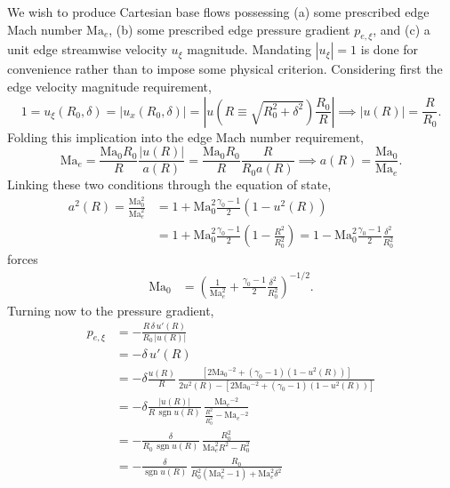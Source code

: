\documentclass[letterpaper,11pt,nointlimits,reqno]{amsart}
\newcommand{\Mach}[1][]{\mbox{Ma}_{#1}}
\begin{document}
We wish to produce Cartesian base flows possessing
(a) some prescribed edge Mach number $\Mach[e]{}$,
(b) some prescribed edge pressure gradient $p_{e,\xi}$, and
(c) a unit edge streamwise velocity $u_\xi$ magnitude.
%
Mandating $\left|u_\xi\right|=1$ is done for convenience rather than to impose
some physical criterion.
%
Considering first the edge velocity magnitude requirement,
\begin{equation}
    1
    = u_\xi\!\left(R_0, \delta\right)
    = \left| u_x\!\left(R_0,\delta\right) \right|
    = \left| u  \!\left(R\equiv\sqrt{R_0^2+\delta^2}\right) \frac{R_0}{R} \right|
\implies
    \left|u\!\left(R\right)\right| = \frac{R}{R_0}
.
\end{equation}
%
Folding this implication into the edge Mach number requirement,
\begin{equation}
    \Mach[e]{}
    =
    \frac{\Mach[0]{} R_0}{R}
    \frac{\left|u\!\left(R\right)\right|}
         {      a\!\left(R\right)       }
    =
    \frac{\Mach[0]{} R_0}{R}
    \frac{R}{R_0 a\!\left(R\right)}
\implies
    a\!\left( R \right) = \frac{\Mach[0]}{\Mach[e]}
.
\end{equation}
%
Linking these two conditions through the equation of state,
\begin{align}
    a^2\!\left(R\right)
    = \frac{\Mach[0]^2}{\Mach[e]^2}
   &= 1 + \Mach[0]^2\frac{\gamma_0-1}{2}\left(1-u^2\!\left(R\right)\right)
\\ &= 1 + \Mach[0]^2\frac{\gamma_0-1}{2}\left(1-\frac{R^2}{R_0^2}\right)
    = 1 - \Mach[0]^2\frac{\gamma_0-1}{2}\frac{\delta^2}{R_0^2}
\end{align}
forces
\begin{align}
    \Mach[0] &= \left(
        \frac{1}{\Mach[e]^2} + \frac{\gamma_0-1}{2}\frac{\delta^2}{R_0^2}
    \right)^{-1/2}
.
\end{align}
%
Turning now to the pressure gradient,
\begin{align}
  p_{e,\xi}
  &=
  - \frac{R \, \delta \, u'\!\left(R\right)}{R_0 \, \left|u\!\left(R\right)\right|}
\\&=
  - \delta \, u'\!\left(R\right)
\\&=
  - \delta
  \frac{u\!\left(R\right)}{R}
       \,
       \frac{
         \left[
             2 \Mach[0]{}^{-2} + \left(\gamma_0-1\right) \left(1 - u^2\!\left(R\right)\right)
         \right]
       }{
           2 u^2\!\left(R\right)
         - \left[
             2 \Mach[0]{}^{-2} + \left(\gamma_0-1\right) \left(1 - u^2\!\left(R\right)\right)
           \right]
       }
\\&=
  - \delta
  \frac{\left|u\!\left(R\right)\right|}{R \, \operatorname{sgn} u\!\left(R\right)}
       \,
       \frac{
           \Mach[e]{}^{-2}
       }{
           \frac{R^2}{R_0^2}
         - \Mach[e]{}^{-2}
       }
\\&=
  -
  \frac{\delta}{R_0 \, \operatorname{sgn} u\!\left(R\right)}
       \,
       \frac{ R_0^2 }{ \Mach[e]^2 R^2 - R_0^2 }
\\&=
  -
  \frac{\delta}{\operatorname{sgn} u\!\left(R\right)}
       \,
       \frac{ R_0 }{ R_0^2 \left(\Mach[e]^2 - 1\right) + \Mach[e]^2 \delta^2 }
\end{align}
\end{document}

